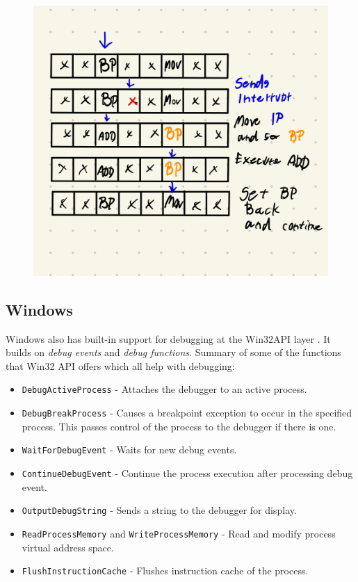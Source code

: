 \begin{figure}
    \includegraphics{media/breakpoint_tbd}
\end{figure}

\subsection{Windows}
Windows also has built-in support for debugging at the Win32API layer
\cite{windows-msdn-debugging-api, windows-press-debugging-api}.
It builds on \textit{debug events} and \textit{debug functions}. Summary of
some of the functions that Win32 API offers which all help with debugging:

\begin{itemize}
    \item \texttt{DebugActiveProcess} - Attaches the debugger to an active process.
    \item \texttt{DebugBreakProcess} - Causes a breakpoint exception to occur in the specified process.
                                          This passes control of the process to the debugger if there is one.
    \item \texttt{WaitForDebugEvent} - Waits for new debug events.
    \item \texttt{ContinueDebugEvent} - Continue the process execution after processing debug event.
    \item \texttt{OutputDebugString} - Sends a string to the debugger for display.
    \item \texttt{ReadProcessMemory} and \texttt{WriteProcessMemory} - Read and modify
          process virtual address space.
    \item \texttt{FlushInstructionCache} - Flushes instruction cache of the process.
\end{itemize}

